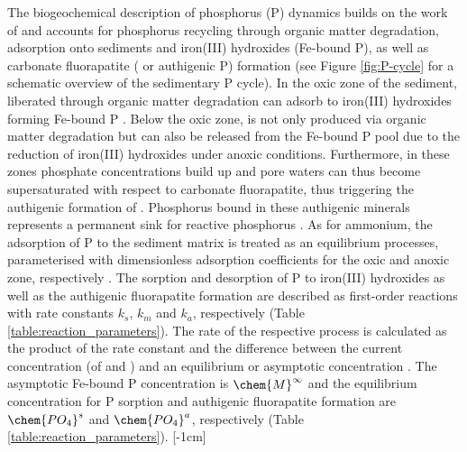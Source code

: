\documentclass[gmd, manuscript]{copernicus}
\begin{document}
The biogeochemical description of phosphorus (P) dynamics builds on the work of \citet{caroline_p_slomp_key_1996} and accounts for phosphorus recycling through organic matter degradation, adsorption onto sediments and 
iron(III) hydroxides (Fe-bound P), as well as carbonate fluorapatite ( or authigenic P) formation (see Figure \ref{fig:P-cycle} for a schematic overview of the sedimentary P cycle). 
In the oxic zone of the sediment,  liberated through organic matter degradation can adsorb 
to iron(III) hydroxides forming Fe-bound P \citep[or ,][]{slomp1998role}. Below the oxic zone,   is not only produced via organic matter degradation but can also be released from the Fe-bound P pool due to the 
reduction of iron(III) hydroxides under anoxic conditions. Furthermore, in these zones phosphate concentrations build up and pore waters can thus become supersaturated with respect to carbonate fluorapatite, 
thus triggering the authigenic formation of  \citep{cappellen_mathematical_1988}. Phosphorus bound in these authigenic minerals represents a permanent sink for reactive phosphorus \citep{caroline_p_slomp_key_1996}. 
As for ammonium, the adsorption of P to the sediment matrix is treated as an equilibrium processes, parameterised with dimensionless adsorption coefficients for the oxic and anoxic zone, 
respectively \citep[$K_\chem{PO_4}^{\mathrm{ox}}$, $K_\chem{PO_4}^{\mathrm{anox}}$][]{slomp1998role}. 
The sorption and desorption of P to iron(III) hydroxides as well as the authigenic fluorapatite formation are described as first-order reactions with rate constants $k_s$, $k_m$ and $k_a$, respectively (Table \ref{table:reaction_parameters}). 
The rate of the respective process is calculated as the product of the rate constant and the difference between the current concentration (of  and ) and an equilibrium or asymptotic concentration \citet{caroline_p_slomp_key_1996}. 
The asymptotic Fe-bound P concentration is $\chem{M}^\infty$ and the equilibrium concentration for P sorption and authigenic fluorapatite formation are $\chem{PO_4}^s$ and $\chem{PO_4}^a$, respectively (Table \ref{table:reaction_parameters}). 
[-1cm]%
\end{document}
